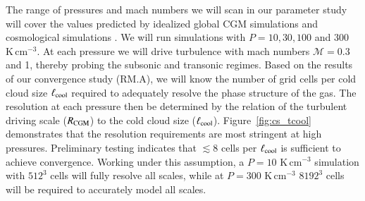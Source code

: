 \documentclass[11pt,letterpaper,english]{article}
\begin{document}
The range of pressures and mach numbers we will scan in our parameter study will cover the values predicted by idealized global CGM simulations \cite{Fielding17} and cosmological simulations \cite{Nelson+16}. We will run simulations with $P = 10, 30, 100$ and 300 K\,cm$^{-3}$.  At each pressure we will drive turbulence with mach numbers $\mathcal{M} = 0.3$ and 1, thereby probing the subsonic and transonic regimes. 
Based on the results of our convergence study (RM.A), we will know the number of grid cells per cold cloud size $\ell_{\rm cool}$ required to adequately resolve the phase structure of the gas.
The resolution at each pressure then be determined by the relation of the turbulent driving scale ($R_{\rm CGM}$) to the cold cloud size ($\ell_{\rm cool}$).
Figure~\ref{fig:cs_tcool} demonstrates that the resolution requirements are most stringent at high pressures. Preliminary testing indicates that $\lesssim 8 $ cells per $\ell_{\rm cool}$ is sufficient to achieve convergence. Working under this assumption, a $P=10$ K\,cm$^{-3}$ simulation with $512^3$ cells will fully resolve all scales, while at $P=300$ K\,cm$^{-3}$ $8192^3$ cells will be required to accurately model all scales. 



\end{document}
